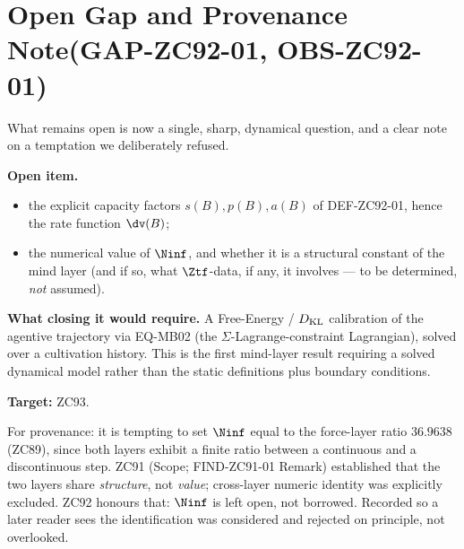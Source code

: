 \documentclass[12pt, a4paper]{article}
\begin{document}
\section{Open Gap and Provenance Note\quad(GAP-ZC92-01, OBS-ZC92-01)}
\label{sec:gapobs-zc92}

What remains open is now a single, sharp, dynamical question, and a clear
note on a temptation we deliberately refused.

\begin{openqbox}[title={GAP-ZC92-01: The Value of $\Ninf$ and the
  Rate Function}]
\textbf{Open item.}
\begin{itemize}[leftmargin=2em, noitemsep]
  \item the explicit capacity factors $s(B),p(B),a(B)$ of DEF-ZC92-01,
    hence the rate function $\dv(B)$;
  \item the numerical value of $\Ninf$, and whether it is a structural
    constant of the mind layer (and if so, what $\Ztf$-data, if any, it
    involves --- to be determined, \emph{not} assumed).
\end{itemize}

\textbf{What closing it would require.} A Free-Energy / $D_{\rm KL}$
calibration of the agentive trajectory via EQ-MB02 (the
$\Sigma$-Lagrange-constraint Lagrangian), solved over a cultivation
history. This is the first mind-layer result requiring a solved dynamical
model rather than the static definitions plus boundary conditions.

\textbf{Target:} ZC93.
\end{openqbox}

\begin{derivedbox}[title={OBS-ZC92-01: The Cross-Layer-Equality Temptation,
  Refused}]
For provenance: it is tempting to set $\Ninf$ equal to the force-layer
ratio $36.9638$ (ZC89), since both layers exhibit a finite ratio between a
continuous and a discontinuous step. ZC91 (Scope; FIND-ZC91-01 Remark)
established that the two layers share \emph{structure}, not \emph{value};
cross-layer numeric identity was explicitly excluded. ZC92 honours that:
$\Ninf$ is left open, not borrowed. Recorded so a later reader sees the
identification was considered and rejected on principle, not overlooked.
\end{derivedbox}
\end{document}
